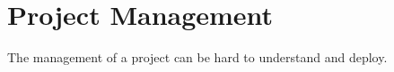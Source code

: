 \chapter{Project Management}
\label{cha:project_management}


The management of a project can be hard to understand and deploy. 

\newpage


\newpage


\newpage


\newpage


\newpage


\newpage


\newpage


%

%
